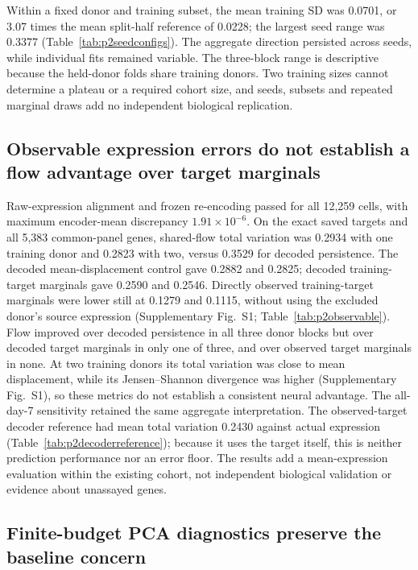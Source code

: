 \documentclass[10pt,a4paper]{article}
\begin{document}
Within a fixed donor and training subset, the mean training SD was 0.0701, or 3.07 times the mean split-half reference of 0.0228; the largest seed range was 0.3377 (Table~\ref{tab:p2seedconfigs}). The aggregate direction persisted across seeds, while individual fits remained variable. The three-block range is descriptive because the held-donor folds share training donors. Two training sizes cannot determine a plateau or a required cohort size, and seeds, subsets and repeated marginal draws add no independent biological replication.

\subsection{Observable expression errors do not establish a flow advantage over target marginals}

Raw-expression alignment and frozen re-encoding passed for all 12,259 cells, with maximum encoder-mean discrepancy $1.91\times10^{-6}$. On the exact saved targets and all 5,383 common-panel genes, shared-flow total variation was 0.2934 with one training donor and 0.2823 with two, versus 0.3529 for decoded persistence. The decoded mean-displacement control gave 0.2882 and 0.2825; decoded training-target marginals gave 0.2590 and 0.2546. Directly observed training-target marginals were lower still at 0.1279 and 0.1115, without using the excluded donor's source expression (Supplementary Fig.~S1; Table~\ref{tab:p2observable}). Flow improved over decoded persistence in all three donor blocks but over decoded target marginals in only one of three, and over observed target marginals in none. At two training donors its total variation was close to mean displacement, while its Jensen--Shannon divergence was higher (Supplementary Fig.~S1), so these metrics do not establish a consistent neural advantage. The all-day-7 sensitivity retained the same aggregate interpretation. The observed-target decoder reference had mean total variation 0.2430 against actual expression (Table~\ref{tab:p2decoderreference}); because it uses the target itself, this is neither prediction performance nor an error floor. The results add a mean-expression evaluation within the existing cohort, not independent biological validation or evidence about unassayed genes.

\subsection{Finite-budget PCA diagnostics preserve the baseline concern}
\end{document}
